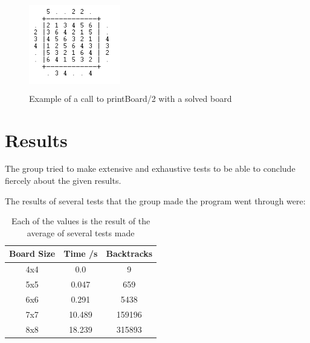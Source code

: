 \documentclass{llncs}
\begin{document}
\begin{figure}[h!]
\begin{center}
\includegraphics[height=4cm,width=4cm]{images/printBoard21.png}
\caption{Example of a call to printBoard/2 with a solved board}
\label{Figure 4}
\end{center}
\end{figure}

%
\section{Results}

The group tried to make extensive and exhaustive tests to be able to conclude fiercely about the given results.

The results of several tests that the group made the program went through were:

\begin{table}[]
\centering
\caption{Each of the values is the result of the average of several tests made}
\label{Results Tablel}
\begin{tabular}{@{}ccc@{}}
\toprule
\multicolumn{1}{c|}{\textbf{Board Size}} & \multicolumn{1}{c|}{\textbf{Time /s}} & \textbf{Backtracks} \\ \midrule
4x4                                      & 0.0                                 & 9                   \\ \midrule
5x5                                      & 0.047                                 & 659                 \\ \midrule
6x6                                      & 0.291                                 & 5438                \\ \midrule
7x7                                      & 10.489                                & 159196              \\ \midrule
8x8                                      & 18.239                                & 315893              \\ \bottomrule
\end{tabular}
\end{table}
\end{document}
